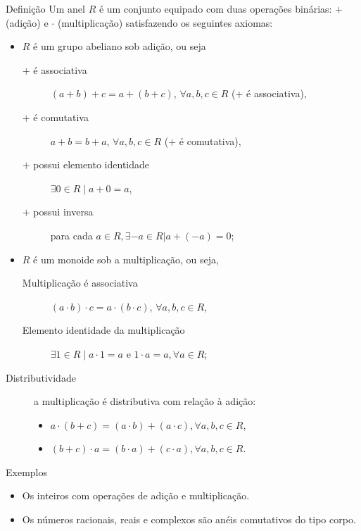 \documentclass[portuguese,aspectratio=169]{beamer}
\begin{document}
\begin{frame}[allowframebreaks]
\framebreak
\begin{block}{Definição}
\fontsize{11pt}{12pt}\selectfont
Um anel $R$ é um conjunto equipado com duas operações binárias: $+$ (adição) e $\cdot$ (multiplicação) satisfazendo os seguintes axiomas:
  \begin{itemize}
    \item $R$ é um grupo abeliano sob adição, ou seja
      \begin{description}
        \item[$+$ é associativa] $(a + b) + c = a + (b + c)$, $\forall a,b,c \in R$ ($+$ é associativa),
        \item[$+$ é comutativa] $a + b = b + a$, $\forall a,b,c \in R$ ($+$ é comutativa),
        \item[$+$ possui elemento identidade] $\exists 0 \in R \mid a + 0 = a$,
        \item[$+$ possui inversa] para cada $a \in R, \exists -a \in R | a + (-a) = 0$;
      \end{description}
    \item $R$ é um monoide sob a multiplicação, ou seja,
      \begin{description}
        \item[Multiplicação é associativa] $(a \cdot b) \cdot c = a \cdot (b \cdot c)$, $\forall a,b,c \in R$,
        \item[Elemento identidade da multiplicação] $\exists 1 \in R \mid a \cdot 1 = a \text{ e } 1 \cdot a = a, \forall a \in R$;
      \end{description}
  \end{itemize}
  \begin{description}
    \item[Distributividade] a multiplicação é distributiva com relação à adição:
      \begin{itemize}
        \item $a \cdot (b + c) = (a \cdot b) + (a \cdot c), \forall a, b, c \in R$,
        \item $(b + c) \cdot a = (b \cdot a) + (c \cdot a), \forall a, b, c \in R$.
      \end{itemize}
  \end{description}
\end{block}

\framebreak
\begin{block}{Exemplos}
  \begin{itemize}
    \item Os inteiros com operações de adição e multiplicação.
    \item Os números racionais, reais e complexos são anéis comutativos do tipo corpo.
  \end{itemize}
\end{block}




\end{frame}
\end{document}
